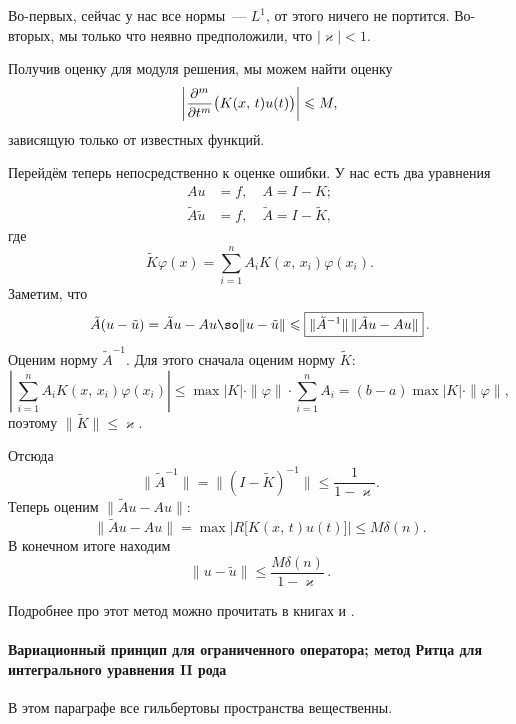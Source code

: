 \documentclass{trlnotes}
\begin{document}
    \begin{rem}
        Во-первых, сейчас у нас все нормы~--- $L^1$, от этого ничего не портится. Во-вторых, мы только что неявно предположили, что $|\varkappa| < 1$.
    \end{rem}

    Получив оценку для модуля решения, мы можем найти оценку
    \[
        \left|\dfrac{\partial^{m}}{\partial t^m} \big(K(x, \, t) u(t)\big)\right| \leqslant M,
    \]
    зависящую только от известных функций.

    Перейдём теперь непосредственно к оценке ошибки. У нас есть два уравнения 
    \begin{align*}
        Au &= f, \quad A = I - K; \\
        \tilde{A} \tilde{u} &= f, \quad \tilde{A} = I - \tilde{K},
    \end{align*}
    где 
    \[
        \tilde{K}\varphi(x) = \sum\limits_{i = 1}^n A_i K(x, \, x_i) \varphi(x_i).
    \]
    Заметим, что
    \[
        \tilde{A}(u - \tilde{u}) = \tilde{A}u - Au \so \|u - \tilde{u}\| \leqslant \boxed{\|\tilde{A}^{-1}\| \, \|\tilde{A}u - Au\|}\,.
    \]
    Оценим норму $\tilde{A}^{-1}$. Для этого сначала оценим норму $\tilde{K}$:
    \[
        \left | \, \sum\limits_{i = 1}^n A_i K(x, \, x_i) \varphi(x_i) \right | \leqslant \max |K| \cdot \|\varphi\| \cdot \sum\limits_{i = 1}^n A_i = (b - a) \max |K| \cdot \|\varphi\|,
    \]
    поэтому $\|\tilde{K}\| \leqslant \varkappa$.

    Отсюда
    \[
        \|\tilde{A}^{-1}\| = \big\|(I - \tilde{K})^{-1}\big\| \leqslant \dfrac{1}{1 - \varkappa}.
    \]
    Теперь оценим $\|\tilde{A}u - Au\|$:
    \[
        \|\tilde{A}u - Au\| = \max \bigg|R\big[K(x, \, t) u(t)\big]\bigg| \leqslant M\delta(n).
    \]
    В конечном итоге находим
    \[
        \boxed{\|u - \tilde{u}\| \leqslant \dfrac{M\delta(n)}{1 - \varkappa}}\,.
    \]

    Подробнее про этот метод можно прочитать в книгах \cite{gavurin} и \cite{comp-krilov-2}.

    \paragraph{Вариационный принцип для ограниченного оператора; метод Ритца для интегрального уравнения II рода}

    \begin{rem}
        В этом параграфе все гильбертовы пространства вещественны.
    \end{rem}
\end{document}
